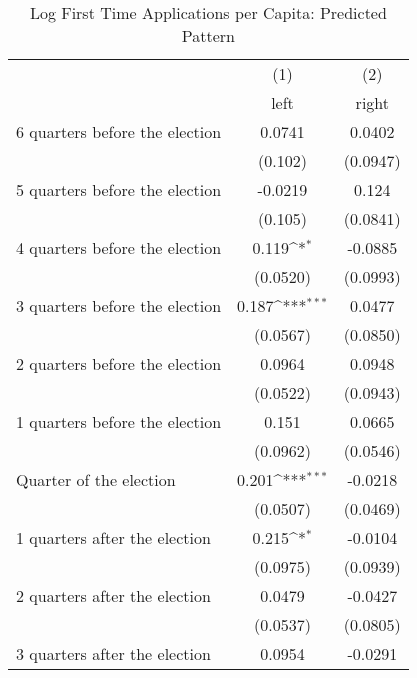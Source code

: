 \begin{table}[htbp]\centering
\def\sym#1{\ifmmode^{#1}\else\(^{#1}\)\fi}
\caption{Log First Time Applications per Capita: Predicted Pattern}
\begin{tabular}{l*{2}{c}}
\hline\hline
                    &\multicolumn{1}{c}{(1)}&\multicolumn{1}{c}{(2)}\\
                    &\multicolumn{1}{c}{left}&\multicolumn{1}{c}{right}\\
\hline
 6 quarters before the election&      0.0741         &      0.0402         \\
                    &     (0.102)         &    (0.0947)         \\
[1em]
 5 quarters before the election&     -0.0219         &       0.124         \\
                    &     (0.105)         &    (0.0841)         \\
[1em]
 4 quarters before the election&       0.119\sym{*}  &     -0.0885         \\
                    &    (0.0520)         &    (0.0993)         \\
[1em]
 3 quarters before the election&       0.187\sym{***}&      0.0477         \\
                    &    (0.0567)         &    (0.0850)         \\
[1em]
 2 quarters before the election&      0.0964         &      0.0948         \\
                    &    (0.0522)         &    (0.0943)         \\
[1em]
 1 quarters before the election&       0.151         &      0.0665         \\
                    &    (0.0962)         &    (0.0546)         \\
[1em]
Quarter of the election&       0.201\sym{***}&     -0.0218         \\
                    &    (0.0507)         &    (0.0469)         \\
[1em]
 1 quarters after the election&       0.215\sym{*}  &     -0.0104         \\
                    &    (0.0975)         &    (0.0939)         \\
[1em]
 2 quarters after the election&      0.0479         &     -0.0427         \\
                    &    (0.0537)         &    (0.0805)         \\
[1em]
 3 quarters after the election&      0.0954         &     -0.0291         \\

\end{tabular}
\end{table}

